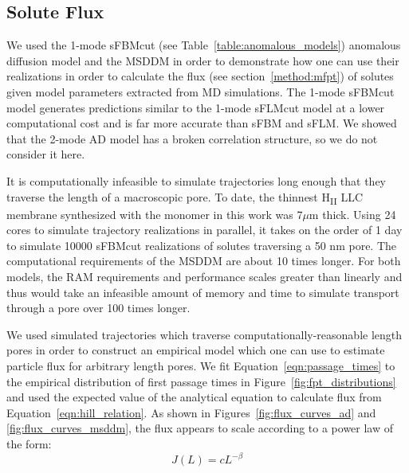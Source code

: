 \documentclass{article}
\begin{document}
  \subsection{Solute Flux}\label{section:mfpt}
  
  We used the 1-mode sFBMcut (see Table~\ref{table:anomalous_models}) anomalous 
  diffusion model and the MSDDM in order to demonstrate how one can use their realizations
  in order to calculate the flux (see section~\ref{method:mfpt}) of solutes given model 
  parameters extracted from MD simulations. The 1-mode sFBMcut model generates predictions
  similar to the 1-mode sFLMcut model at a lower computational cost and is far more
  accurate than sFBM and sFLM. We showed that the 2-mode AD model has a broken correlation
  structure, so we do not consider it here.

  It is computationally infeasible to simulate trajectories long enough that they
  traverse the length of a macroscopic pore. To date, the thinnest H\textsubscript{II}
  LLC membrane synthesized with the monomer in this work was 7$\mu$m thick. Using
  24 cores to simulate trajectory realizations in parallel, it takes on the order 
  of 1 day to simulate 10000 sFBMcut realizations of solutes traversing a 50 nm pore.
  The computational requirements of the MSDDM are about 10 times longer. For both
  models, the RAM requirements and performance scales greater than linearly and 
  thus would take an infeasible amount of memory and time to simulate transport 
  through a pore over 100 times longer.
  
  We used simulated trajectories which traverse computationally-reasonable length
  pores in order to construct an empirical model which one can use to estimate 
  particle flux for arbitrary length pores. We fit Equation~\ref{eqn:passage_times}
  to the empirical distribution of first passage times in Figure~\ref{fig:fpt_distributions}
  and used the expected value of the analytical equation to calculate flux from 
  Equation~\ref{eqn:hill_relation}. As shown in Figures~\ref{fig:flux_curves_ad} and
  \ref{fig:flux_curves_msddm}, the flux appears to scale according to a power law 
  of the form:
  \begin{equation}
  J(L) = cL^{-\beta} 
  \label{eqn:flux_decay}
  \end{equation}
  
\end{document}
